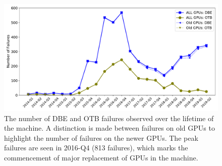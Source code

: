 \begin{figure}[bt]
  \begin{center}
    \includegraphics[trim={0 1em 0 1em},clip,width=\columnwidth]{figs/NumFailures_Quarterly_newOld.pdf}
  \end{center}
  \caption{The number of DBE and OTB failures observed over the lifetime of the machine.
A distinction is made between failures on old GPUs to highlight the number
of failures on the newer GPUs. The peak failures are seen in 2016-Q4 (813 failures), 
which marks the commencement of major replacement of GPUs in the machine.}
  \label{fig:NumFails_sys}
\end{figure}

